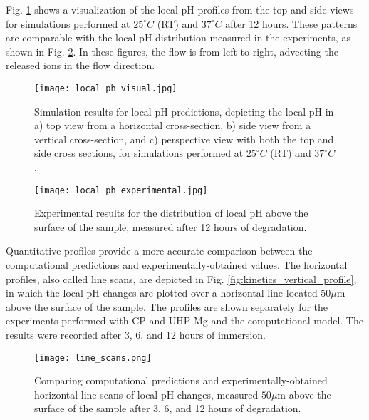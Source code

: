 Fig. \ref{fig:kinetics_local_ph_visual} shows a visualization of the local pH profiles from the top and side views for simulations performed at  $25^{\circ}C$ (\gls{RT}) and $37^{\circ}C$ after 12 hours. These patterns are comparable with the local pH distribution measured in the experiments, as shown in Fig. \ref{fig:kinetics_local_ph_experimental}. In these figures, the flow is from left to right, advecting the released ions in the flow direction.

\begin{figure}[h]
\centering
\medskip
\texttt{[image: local\_ph\_visual.jpg]}
\caption[Simulation results for local pH predictions]{Simulation results for local pH predictions, depicting the local pH in a) top view from a horizontal cross-section, b) side view from a vertical cross-section, and c) perspective view with both the top and side cross sections, for simulations performed at $25^{\circ}C$ (\gls{RT}) and $37^{\circ}C$.} \label{fig:kinetics_local_ph_visual}
\end{figure}

\begin{figure}[h]
\centering
\medskip
\texttt{[image: local\_ph\_experimental.jpg]}
\caption[Experimental results for the distribution of local pH above the sample]{Experimental results for the distribution of local pH above the surface of the sample, measured after 12 hours of degradation.} \label{fig:kinetics_local_ph_experimental}
\end{figure}

Quantitative profiles provide a more accurate comparison between the computational predictions and experimentally-obtained values. The horizontal profiles, also called line scans, are depicted in Fig. \ref{fig:kinetics_vertical_profile}, in which the local pH changes are plotted over a horizontal line located $50 \mu\mathrm{m}$ above the surface of the sample. The profiles are shown separately for the experiments performed with \gls{CP} and \gls{UHP} Mg and the computational model. The results were recorded after 3, 6, and 12 hours of immersion.

\begin{figure}[h]
\centering
\medskip
\texttt{[image: line\_scans.png]}
\caption[Comparing computational and experimental for horizontal line scans of local pH]{Comparing computational predictions and experimentally-obtained horizontal line scans of local pH changes, measured $50 \mu\mathrm{m}$ above the surface of the sample after 3, 6, and 12 hours of degradation.} \label{fig:kinetics_line_scans}
\end{figure}

